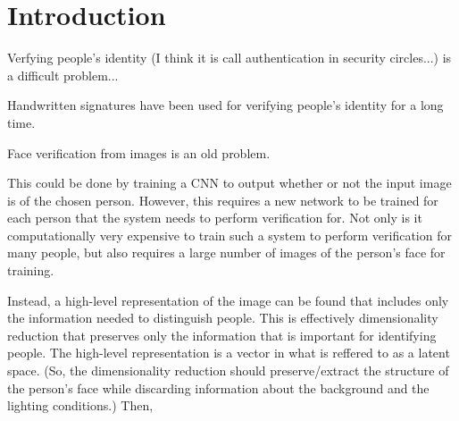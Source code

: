 \section{Introduction}\label{sec:introduction}

Verfying people's identity (I think it is call authentication in security circles...) is a difficult problem...

Handwritten signatures have been used for verifying people's identity for a long time.

Face verification from images is an old problem.

This could be done by training a CNN to output whether or not the input image is of the chosen person.
However, this requires a new network to be trained for each person that the system needs to perform verification for.
Not only is it computationally very expensive to train such a system to perform verification for many people, but also requires a large number of images of the person's face for training.

Instead, a high-level representation of the image can be found that includes only the information needed to distinguish people.
This is effectively dimensionality reduction that preserves only the information that is important for identifying people.
The high-level representation is a vector in what is reffered to as a latent space.
(So, the dimensionality reduction should preserve/extract the structure of the person's face while discarding information about the background and the lighting conditions.)
Then, 
